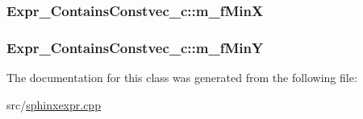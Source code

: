 \hypertarget{classExpr__ContainsConstvec__c_a45eb42e8be0860ba0fa554bb43990537}{
\subsubsection[{m\-\_\-f\-Min\-X}]{ Expr\-\_\-\-Contains\-Constvec\-\_\-c\-::m\-\_\-f\-Min\-X\hspace{0.3cm}{\ttfamily [protected]}}}\label{classExpr__ContainsConstvec__c_a45eb42e8be0860ba0fa554bb43990537}
\hypertarget{classExpr__ContainsConstvec__c_ab34b8abeae9b159be3daef872c4d4fd1}{
\subsubsection[{m\-\_\-f\-Min\-Y}]{ Expr\-\_\-\-Contains\-Constvec\-\_\-c\-::m\-\_\-f\-Min\-Y\hspace{0.3cm}{\ttfamily [protected]}}}\label{classExpr__ContainsConstvec__c_ab34b8abeae9b159be3daef872c4d4fd1}


The documentation for this class was generated from the following file\-:\begin{DoxyCompactItemize}
\item 
src/\hyperlink{sphinxexpr_8cpp}{sphinxexpr.\-cpp}\end{DoxyCompactItemize}
